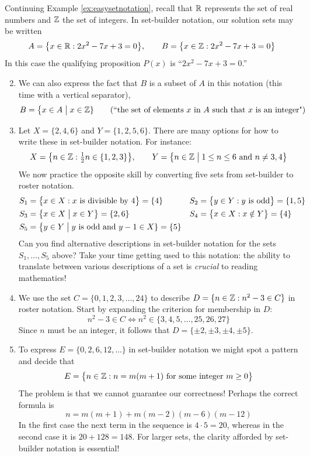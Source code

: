 \begin{examples}{}{}
	\exstart Continuing Example \ref{ex:easysetnotation}, recall that $\mathbb{R}$ represents the set of real numbers and $\mathbb{Z}$ the set of integers. In set-builder notation, our solution sets may be written
	\[
		A=\bigl\{x\in\mathbb{R}:2x^2-7x+3=0\bigr\},\qquad B=\bigl\{x\in\mathbb{Z}:2x^2-7x+3=0\bigr\}
	\]
	In this case the qualifying proposition $P(x)$ is ``$2x^2-7x+3=0$.''
	\begin{enumerate}\setcounter{enumi}{1}
	  \item[]We can also express the fact that $B$ is a subset of $A$ in this notation (this time with a vertical separator),
	\[
		B=\bigl\{x\in A\bigm| x\in\mathbb{Z}\} \tag{``the set of elements $x$ in $A$ such that $x$ is an integer"}
	\]
	
	\item Let $X=\{2,4,6\}$ and $Y=\{1,2,5,6\}$. There are many options for how to write these in set-builder notation. For instance:
	\[
		X=\bigl\{n\in\mathbb{Z}:\tfrac 12n\in\{1,2,3\}\bigr\},\qquad Y=\bigl\{n\in\mathbb{Z}\bigm|1\le n\le 6\text{ and }n\neq 3,4\bigr\}
	\]
	We now practice the opposite skill by converting five sets from set-builder to roster notation.
	\begin{align*}
		&S_1=\bigl\{x\in X:x\text{ is divisible by 4}\bigr\}=\{4\}
		&&
		S_2=\bigl\{y\in Y:y\text{ is odd}\bigr\}=\{1,5\}
		\\
		&S_3=\bigl\{x\in X\bigm| x\in Y\bigr\}=\{2,6\}
		&&
		S_4=\bigl\{x\in X:x\notin Y\bigr\}=\{4\}
		\\
		&S_5=\bigl\{y\in Y\bigm| y\text{ is odd and $y-1\in X$}\}=\{5\}
	\end{align*}
	Can you find alternative descriptions in set-builder notation for the sets $S_1,\ldots,S_5$ above? Take your time getting used to this notation: the ability to translate between various descriptions of a set is \emph{crucial} to reading mathematics!
	
	\item We use the set $C=\{0,1,2,3,\ldots,24\}$ to describe $D=\{n\in\mathbb{Z}:n^2-3\in C\}$ in roster notation. Start by expanding the criterion for membership in $D$:
  \[
  	n^2-3\in C\iff n^2\in\bigl\{3,4,5,\ldots,25,26,27\bigr\}
  \]
  Since $n$ must be an integer, it follows that $D=\{\pm 2,\pm 3,\pm 4,\pm 5\}$.
  
  \item To express $E=\{0,2,6,12,\ldots\}$ in set-builder notation we might spot a pattern and decide that
  \[
  	E=\bigl\{n\in\mathbb{Z}: n=m(m+1) \text{ for some integer }m\ge 0\bigr\}
  \]
  The problem is that we cannot guarantee our correctness! Perhaps the correct formula is
  \[
  	n=m(m+1)+m(m-2)(m-6)(m-12)
  \]
	In the first case the next term in the sequence is $4\cdot 5=20$, whereas in the second case it is $20+128=148$. For larger sets, the clarity afforded by set-builder notation is essential!

	\end{enumerate}
\end{examples}



